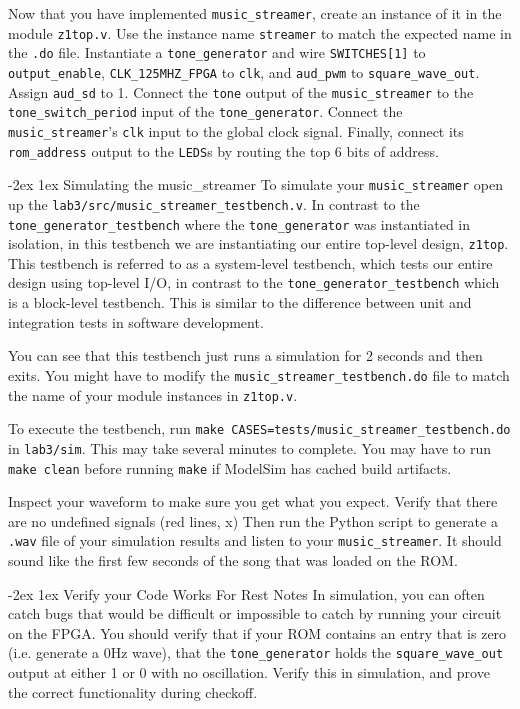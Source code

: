 \documentclass[11pt]{article}
\makeatletter
\renewcommand{\section}
{\@startsection {section}{1}{0pt}
 {-2ex}
 {1ex}
 {\bfseries\Large}}
\makeatother
\begin{document}
Now that you have implemented \verb|music_streamer|, create an instance of it in the module \verb|z1top.v|. Use the instance name \verb|streamer| to match the expected name in the \verb|.do| file. Instantiate a \verb|tone_generator| and wire \verb|SWITCHES[1]| to \verb|output_enable|, \verb|CLK_125MHZ_FPGA| to \verb|clk|, and \verb|aud_pwm| to \verb|square_wave_out|.  Assign \verb|aud_sd| to 1.  Connect the \verb|tone| output of the \verb|music_streamer| to the \verb|tone_switch_period| input of the \verb|tone_generator|. Connect the \verb|music_streamer|'s \verb|clk| input to the global clock signal. Finally, connect  its \verb|rom_address| output to the \verb|LEDS|s by routing the top 6 bits of address.

\section{Simulating the music\_streamer}
To simulate your \verb|music_streamer| open up the \verb|lab3/src/music_streamer_testbench.v|. In contrast to the \verb|tone_generator_testbench| where the \verb|tone_generator| was instantiated in isolation, in this testbench we are instantiating our entire top-level design, \verb|z1top|. This testbench is referred to as a system-level testbench, which tests our entire design using top-level I/O, in contrast to the \verb|tone_generator_testbench| which is a block-level testbench. This is similar to the difference between unit and integration tests in software development.

You can see that this testbench just runs a simulation for 2 seconds and then exits. You might have to modify the \verb|music_streamer_testbench.do| file to match the name of your module instances in \verb|z1top.v|.

To execute the testbench, run \verb|make CASES=tests/music_streamer_testbench.do| in \verb|lab3/sim|. This may take several minutes to complete. You may have to run \verb|make clean| before running \verb|make| if ModelSim has cached build artifacts.

Inspect your waveform to make sure you get what you expect. Verify that there are no undefined signals (red lines, x) Then run the Python script to generate a \verb|.wav| file of your simulation results and listen to your \verb|music_streamer|. It should sound like the first few seconds of the song that was loaded on the ROM.

\section{Verify your Code Works For Rest Notes}
In simulation, you can often catch bugs that would be difficult or impossible to catch by running your circuit on the FPGA. You should verify that if your ROM contains an entry that is zero (i.e. generate a 0Hz wave), that the \verb|tone_generator| holds the \verb|square_wave_out| output at either 1 or 0 with no oscillation. Verify this in simulation, and prove the correct functionality during checkoff.
\end{document}
